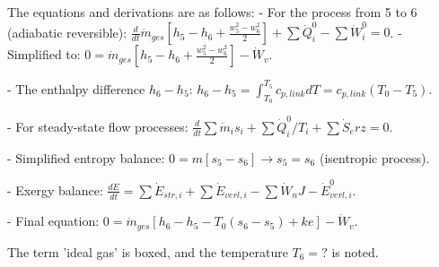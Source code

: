 The equations and derivations are as follows:  
- For the process from 5 to 6 (adiabatic reversible):  
  \( \frac{d}{dt} \dot{m}_{ges} [h_5 - h_6 + \frac{w_5^2 - w_6^2}{2}] + \sum \dot{Q}_i^0 - \sum \dot{W}_i^0 = 0 \).  
- Simplified to:  
  \( 0 = \dot{m}_{ges} [h_5 - h_6 + \frac{w_5^2 - w_6^2}{2}] - \dot{W}_v \).  

- The enthalpy difference \( h_6 - h_5 \):  
  \( h_6 - h_5 = \int_{T_0}^{T_5} c_{p,link} dT = c_{p,link} (T_0 - T_5) \).  

- For steady-state flow processes:  
  \( \frac{d}{dt} \sum \dot{m}_i s_i + \sum \dot{Q}_i^0 / T_i + \sum \dot{S}_erz = 0 \).  

- Simplified entropy balance:  
  \( 0 = m [s_5 - s_6] \rightarrow s_5 = s_6 \) (isentropic process).  

- Exergy balance:  
  \( \frac{dE}{dt} = \sum \dot{E}_{str,i} + \sum \dot{E}_{verl,i} - \sum \dot{W}_n J - \dot{E}_{verl,i}^0 \).  

- Final equation:  
  \( 0 = \dot{m}_{ges} [h_6 - h_5 - T_0 (s_6 - s_5) + ke] - \dot{W}_v \).  

The term 'ideal gas' is boxed, and the temperature \( T_6 = ? \) is noted.